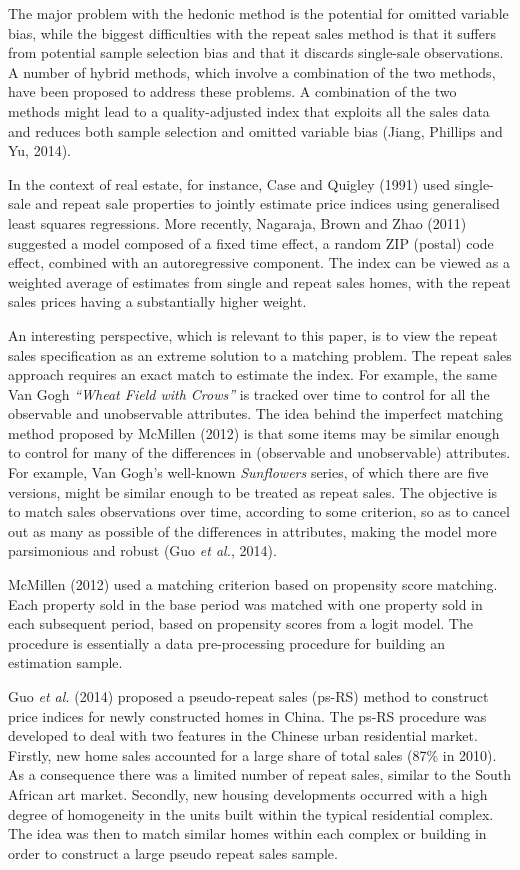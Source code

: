 \documentclass[12pt,]{article}
\begin{document}
The major problem with the hedonic method is the potential for omitted
variable bias, while the biggest difficulties with the repeat sales
method is that it suffers from potential sample selection bias and that
it discards single-sale observations. A number of hybrid methods, which
involve a combination of the two methods, have been proposed to address
these problems. A combination of the two methods might lead to a
quality-adjusted index that exploits all the sales data and reduces both
sample selection and omitted variable bias (Jiang, Phillips and Yu,
2014).

In the context of real estate, for instance, Case and Quigley (1991)
used single-sale and repeat sale properties to jointly estimate price
indices using generalised least squares regressions. More recently,
Nagaraja, Brown and Zhao (2011) suggested a model composed of a fixed
time effect, a random ZIP (postal) code effect, combined with an
autoregressive component. The index can be viewed as a weighted average
of estimates from single and repeat sales homes, with the repeat sales
prices having a substantially higher weight.

An interesting perspective, which is relevant to this paper, is to view
the repeat sales specification as an extreme solution to a matching
problem. The repeat sales approach requires an exact match to estimate
the index. For example, the same Van Gogh \emph{``Wheat Field with
Crows''} is tracked over time to control for all the observable and
unobservable attributes. The idea behind the imperfect matching method
proposed by McMillen (2012) is that some items may be similar enough to
control for many of the differences in (observable and unobservable)
attributes. For example, Van Gogh's well-known \emph{Sunflowers} series,
of which there are five versions, might be similar enough to be treated
as repeat sales. The objective is to match sales observations over time,
according to some criterion, so as to cancel out as many as possible of
the differences in attributes, making the model more parsimonious and
robust (Guo \emph{et al.}, 2014).

McMillen (2012) used a matching criterion based on propensity score
matching. Each property sold in the base period was matched with one
property sold in each subsequent period, based on propensity scores from
a logit model. The procedure is essentially a data pre-processing
procedure for building an estimation sample.

Guo \emph{et al.} (2014) proposed a pseudo-repeat sales (ps-RS) method
to construct price indices for newly constructed homes in China. The
ps-RS procedure was developed to deal with two features in the Chinese
urban residential market. Firstly, new home sales accounted for a large
share of total sales (87\% in 2010). As a consequence there was a
limited number of repeat sales, similar to the South African art market.
Secondly, new housing developments occurred with a high degree of
homogeneity in the units built within the typical residential complex.
The idea was then to match similar homes within each complex or building
in order to construct a large pseudo repeat sales sample.
\end{document}
